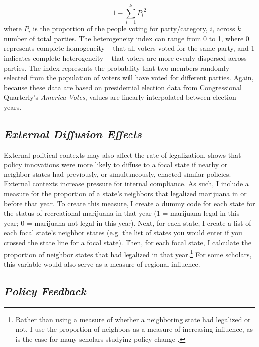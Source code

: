 \begin{equation}
1 - \sum_{i = 1}^{k}{P_{i}}^2
\end{equation}
where $P_{i}$ is the proportion of the people voting for party/category, $i$, across $k$ number of total parties. The heterogeneity index can range from 0 to 1, where 0 represents complete homogeneity -- that all voters voted for the same party, and 1 indicates complete heterogeneity -- that voters are more evenly dispersed across parties. The index represents the probability that two members randomly selected from the population of voters will have voted for different parties. Again, because these data are based on presidential election data from Congressional Quarterly's {\it{America Votes}}, values are linearly interpolated between election years.

\subsection{\it{External Diffusion Effects}}

External political contexts may also affect the rate of legalization. \citet{boushey_2016}shows that policy innovations were more likely to diffuse to a focal state if nearby or neighbor states had previously, or simultaneously, enacted similar policies. External contexts increase pressure for internal compliance. As such, I include a measure for the proportion of a state's neighbors that legalized marijuana in or before that year. To create this measure, I create a dummy code for each state for the status of recreational marijuana in that year (1 = marijuana legal in this year; 0 = marijuana not legal in this year). Next, for each state, I create a list of each focal state's neighbor states (e.g. the list of states you would enter if you crossed the state line for a focal state). Then, for each focal state, I calculate the proportion of neighbor states that had legalized in that year.\footnote{Rather than using a measure of whether a neighboring state had legalized or not, I use the proportion of neighbors as a measure of increasing influence, as is the case for many scholars studying policy change \citep{boushey_2016,key_1949}.} For some scholars, this variable would also serve as a measure of regional influence.


\subsection{\it{Policy Feedback}}

